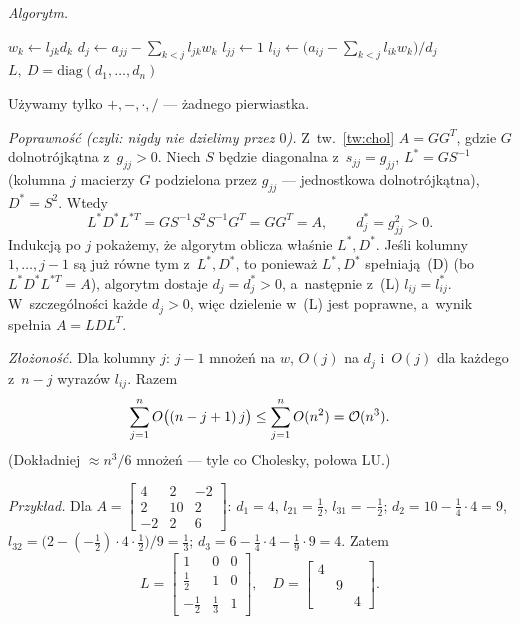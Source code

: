 \documentclass[11pt]{article}
\begin{document}
\emph{Algorytm.}
\begin{algorithmic}[1]
    \State $w_k\gets l_{jk}d_k$
  \EndFor
  \State $d_j\gets a_{jj}-\sum_{k<j}l_{jk}w_k$
  \State $l_{jj}\gets1$
    \State $l_{ij}\gets\bigl(a_{ij}-\sum_{k<j}l_{ik}w_k\bigr)/d_j$
  \EndFor
\EndFor
\State \Return $L,\ D=\mathrm{diag}(d_1,\ldots,d_n)$
\end{algorithmic}
Używamy tylko $+,-,\cdot,/$ --- żadnego pierwiastka.

\emph{Poprawność (czyli: nigdy nie dzielimy przez $0$).} Z~tw.~\ref{tw:chol}
$A=GG^T$, gdzie $G$ dolnotrójkątna z~$g_{jj}>0$. Niech $S$ będzie diagonalna
z~$s_{jj}=g_{jj}$, $L^*=GS^{-1}$ (kolumna $j$ macierzy $G$ podzielona
przez $g_{jj}$ --- jednostkowa dolnotrójkątna), $D^*=S^2$. Wtedy
\[
L^*D^*L^{*T}=GS^{-1}S^2S^{-1}G^T=GG^T=A,
\qquad d^*_j=g_{jj}^2>0.
\]
Indukcją po $j$ pokażemy, że algorytm oblicza właśnie $L^*,D^*$. Jeśli
kolumny $1,\ldots,j-1$ są już równe tym z~$L^*,D^*$, to ponieważ $L^*,D^*$
spełniają~\textup{(D)} (bo $L^*D^*L^{*T}=A$), algorytm dostaje
$d_j=d^*_j>0$, a~następnie z~\textup{(L)} $l_{ij}=l^*_{ij}$. W~szczególności
każde $d_j>0$, więc dzielenie w~\textup{(L)} jest poprawne, a~wynik spełnia
$A=LDL^T$.

\emph{Złożoność.} Dla kolumny $j$: $j-1$ mnożeń na $w$, $O(j)$ na $d_j$
i~$O(j)$ dla każdego z~$n-j$ wyrazów $l_{ij}$. Razem
\[
\sum_{j=1}^n O\bigl((n-j+1)\,j\bigr)\le\sum_{j=1}^nO(n^2)=\mathcal{O}(n^3).
\]
(Dokładniej $\approx n^3/6$ mnożeń --- tyle co Cholesky, połowa LU.)

\emph{Przykład.} Dla
$A=\left[\begin{smallmatrix}4&2&-2\\2&10&2\\-2&2&6\end{smallmatrix}\right]$:
$d_1=4$, $l_{21}=\tfrac12$, $l_{31}=-\tfrac12$; $d_2=10-\tfrac14\cdot4=9$,
$l_{32}=\bigl(2-(-\tfrac12)\cdot4\cdot\tfrac12\bigr)/9=\tfrac13$;
$d_3=6-\tfrac14\cdot4-\tfrac19\cdot9=4$. Zatem
\[
L=\begin{bmatrix}1&0&0\\\frac12&1&0\\-\frac12&\frac13&1\end{bmatrix},
\quad D=\begin{bmatrix}4&&\\&9&\\&&4\end{bmatrix}.
\]
\end{document}
